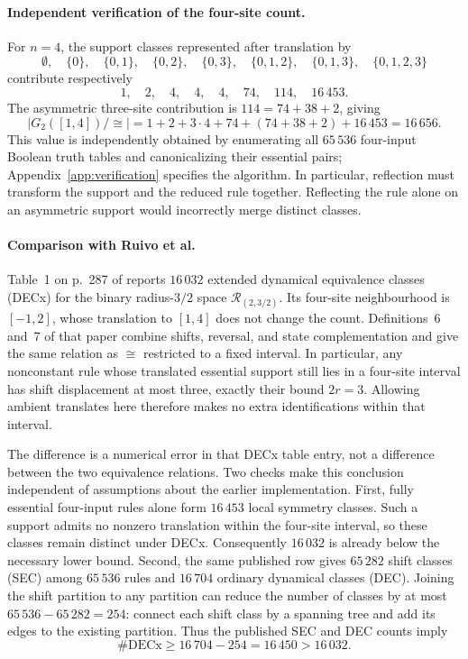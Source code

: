 \documentclass[11pt,a4paper]{article}
\newenvironment{revision}{\color{blue}}{}
\newenvironment{revision}{\color{black}}{}
\newcommand{\locmark}[1]{\label{#1}\linelabel{line:#1}}
\begin{document}
\begin{revision}
\paragraph{Independent verification of the four-site count.}
\locmark{loc:four-site}
For $n=4$, the support classes represented after translation by
\[
\emptyset,\quad\{0\},\quad\{0,1\},\quad\{0,2\},\quad\{0,3\},
\quad\{0,1,2\},\quad\{0,1,3\},\quad\{0,1,2,3\}
\]
contribute respectively
\[
1,\quad2,\quad4,\quad4,\quad4,\quad74,\quad114,\quad16\,453.
\]
The asymmetric three-site contribution is
$114=74+38+2$, giving
\begin{equation}\label{eq:four-site-audit}
|G_2([1,4])/{\cong}|
=1+2+3\cdot4+74+(74+38+2)+16\,453
=16\,656.
\end{equation}
This value is independently obtained by enumerating all $65\,536$
four-input Boolean truth tables and canonicalizing their essential pairs;
Appendix~\ref{app:verification} specifies the algorithm.
In particular, reflection must transform the support and the reduced rule
together. Reflecting the rule alone on an asymmetric support would
incorrectly merge distinct classes.

\paragraph{Comparison with Ruivo et al.}
\locmark{loc:ref16}
Table~1 on p.~287 of \cite{RUIVO2018280} reports $16\,032$ extended
dynamical equivalence classes (DECx) for the binary radius-$3/2$ space
$\mathcal R_{(2,3/2)}$. Its four-site neighbourhood is $[-1,2]$, whose
translation to $[1,4]$ does not change the count. Definitions~6 and~7 of
that paper combine shifts, reversal, and state complementation and give
the same relation as $\cong$ restricted to a fixed interval. In particular,
any nonconstant rule whose translated essential support still lies in a
four-site interval has shift displacement at most three, exactly their
bound $2r=3$. Allowing ambient translates here therefore makes no extra
identifications within that interval.

The difference is a numerical error in that DECx table entry, not a
difference between the two equivalence relations. Two checks make this
conclusion independent of assumptions about the earlier implementation.
First, fully essential four-input rules alone form $16\,453$ local
symmetry classes. Such a support admits no nonzero translation within
the four-site interval, so these classes remain distinct under DECx.
Consequently $16\,032$ is already below the necessary lower bound.
Second, the same published row gives $65\,282$ shift classes (SEC)
among $65\,536$ rules and $16\,704$ ordinary dynamical classes (DEC).
Joining the shift partition to any partition can reduce the number of
classes by at most $65\,536-65\,282=254$: connect each shift class by
a spanning tree and add its edges to the existing partition.
Thus the published SEC and DEC counts imply
\[
\#\mathrm{DECx}\geq16\,704-254=16\,450>16\,032.
\]


\end{revision}
\end{document}
